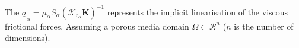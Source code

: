 \documentclass[preprint,authoryear,12pt]{elsarticle}
\begin{document}
\noindent The ${\underline {\underline \sigma}}_{\alpha}=\mu_\alpha S_\alpha \left(\mathcal{K}_{{r}_\alpha}\mathbf{K}\right)^{-1}$ represents the implicit linearisation of the viscous frictional forces. Assuming a porous media domain $\Omega\subset\mathcal{R}^{n}$ ($n$ is the number of dimensions). 

\end{document}

